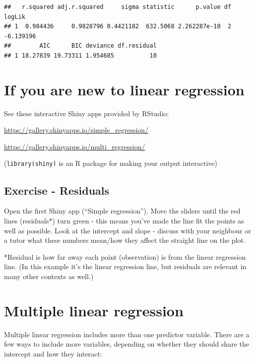 \documentclass[]{book}
\makeatletter
\newenvironment{Shaded}{\begin{snugshade}}{\end{snugshade}}
\newcommand{\KeywordTok}[1]{\textcolor[rgb]{0.13,0.29,0.53}{\textbf{#1}}}
\newcommand{\StringTok}[1]{\textcolor[rgb]{0.31,0.60,0.02}{#1}}
\newcommand{\OperatorTok}[1]{\textcolor[rgb]{0.81,0.36,0.00}{\textbf{#1}}}
\newcommand{\NormalTok}[1]{#1}
\newenvironment{kframe}{%
\medskip{}
\setlength{\fboxsep}{.8em}
 \def\at@end@of@kframe{}%
 \ifinner\ifhmode%
  \def\at@end@of@kframe{\end{minipage}}%
  \begin{minipage}{\columnwidth}%
 \fi\fi%
 \def\FrameCommand##1{\hskip\@totalleftmargin \hskip-\fboxsep
 \colorbox{shadecolor}{##1}\hskip-\fboxsep
     \hskip-\linewidth \hskip-\@totalleftmargin \hskip\columnwidth}%
 \MakeFramed {\advance\hsize-\width
   \@totalleftmargin\z@ \linewidth\hsize
   \@setminipage}}%
 {\par\unskip\endMakeFramed%
 \at@end@of@kframe}
\renewenvironment{Shaded}{\begin{kframe}}{\end{kframe}}
\makeatother
\begin{document}
\begin{Shaded}
\end{Shaded}

\begin{verbatim}
##   r.squared adj.r.squared     sigma statistic      p.value df    logLik
## 1  0.984436     0.9828796 0.4421182  632.5068 2.262287e-10  2 -6.139196
##        AIC      BIC deviance df.residual
## 1 18.27839 19.73311 1.954685          10
\end{verbatim}

\section{If you are new to linear
regression}\label{if-you-are-new-to-linear-regression}

See these interactive Shiny apps provided by RStudio:

\url{https://gallery.shinyapps.io/simple_regression/}

\url{https://gallery.shinyapps.io/multi_regression/}

(\texttt{library(shiny)} is an R package for making your output
interactive)

\subsection{Exercise - Residuals}\label{exercise---residuals}

Open the first Shiny app (``Simple regression''). Move the sliders until
the red lines (residuals*) turn green - this means you've made the line
fit the points as well as possible. Look at the intercept and slope -
discuss with your neighbour or a tutor what these numbers mean/how they
affect the straight line on the plot.

*Residual is how far away each point (observation) is from the linear
regression line. (In this example it's the linear regression line, but
residuals are relevant in many other contexts as well.)

\section{Multiple linear regression}\label{multiple-linear-regression}

Multiple linear regression includes more than one predictor variable.
There are a few ways to include more variables, depending on whether
they should share the intercept and how they interact:
\end{document}
